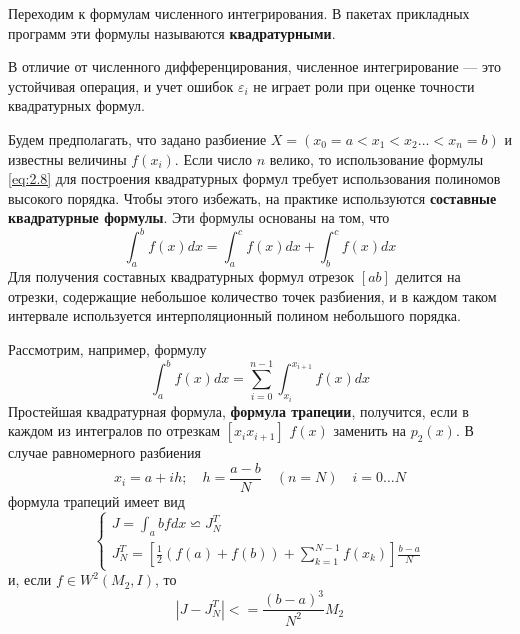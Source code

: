 Переходим к формулам численного интегрирования. В пакетах прикладных программ эти формулы называются \textbf{квадратурными}.

В отличие от численного дифференцирования, численное интегрирование --- это устойчивая операция, и учет ошибок $\varepsilon_i$ не играет роли при оценке точности квадратурных формул.

Будем предполагать, что задано разбиение $X=(x_0=a<x_1<x_2\dots<x_n=b)$ и известны величины $f(x_i)$. Если число $n$ велико, то использование формулы \ref{eq:2.8} для построения квадратурных формул требует использования полиномов высокого порядка. Чтобы этого избежать, на практике используются \textbf{составные квадратурные формулы}. Эти формулы основаны на том, что
\begin{equation}
	\int_{a}^{b} f(x)dx = \int_{a}^{c}f(x)dx + \int_{b}^{c}f(x)dx
\end{equation}
Для получения составных квадратурных формул  отрезок $[ab]$ делится на отрезки, содержащие небольшое количество точек разбиения, и в каждом таком интервале используется интерполяционный полином небольшого порядка.

Рассмотрим, например, формулу
\begin{equation}
	\int_{a}^{b} f(x)dx = \sum_{i=0}^{n-1}\int_{x_i}^{x_{i+1}}f(x)dx
\end{equation}
Простейшая квадратурная формула, \textbf{формула трапеции}, получится, если в каждом из интегралов по отрезкам $[x_ix_{i+1}]$ $f(x)$ заменить на $p_2(x)$. В случае равномерного разбиения
\begin{equation}
x_i = a + ih; \quad h = \frac{a-b}{N} \quad (n=N) \quad i=0 \dots N
\end{equation}
формула трапеций имеет вид
\begin{dmath}
	\begin{cases}
		J = \int_{a}{b}fdx \backsimeq J^T_N \\ 
		J^T_N = [\frac{1}{2}(f(a)+f(b)) + \sum_{k=1}^{N-1}f(x_k)]\frac{b-a}{N}
	\end{cases}
\end{dmath}
и, если $f \in W^2(M_2,I)$, то
\begin{equation}
	|J-J^T_N| <= \frac{(b-a)^3}{N^2}M_2
\end{equation}

